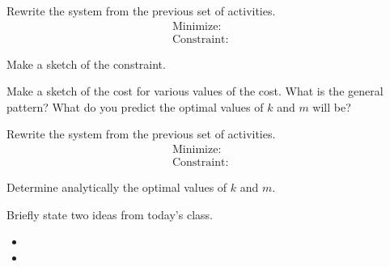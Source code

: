 \begin{problem}
\item Rewrite the system from the previous set of activities.
    \begin{eqnarray*}
      \mathrm{Minimize:} & &  \\
      \mathrm{Constraint:} & & 
    \end{eqnarray*}

\item Make a sketch of the constraint.

  \vfill

\item Make a sketch of the cost for various values of the cost. What
  is the general pattern? What do you predict the optimal values of
  $k$ and $m$ will be?

  \vspace{3em}

\clearpage

\item Rewrite the system from the previous set of activities.
    \begin{eqnarray*}
      \mathrm{Minimize:} & &  \\
      \mathrm{Constraint:} & & 
    \end{eqnarray*}

\item Determine analytically the optimal values of $k$ and $m$.
  \vfill


\end{problem}

\postClass

\begin{problem}
\item Briefly state two ideas from today's class.
  \begin{itemize}
  \item 
  \item 
  \end{itemize}
\item 
  \begin{subproblem}
    \item
  \end{subproblem}
\end{problem}


